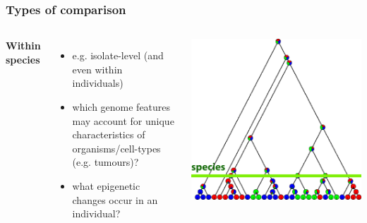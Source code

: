 
%
\begin{frame}
  \frametitle{Types of comparison}
    \begin{columns}[T] 
        \textcolor{RawSienna}{\textbf{Within species}}
        \begin{itemize}
	  \item e.g. isolate-level (and even within individuals)
	  \item which genome features may account for unique characteristics of organisms/cell-types (e.g. tumours)?
	  \item what epigenetic changes occur in an individual?
	\end{itemize}
        \includegraphics[width=\textwidth]{images/cladogram_species}
    \end{columns}  
\end{frame}

